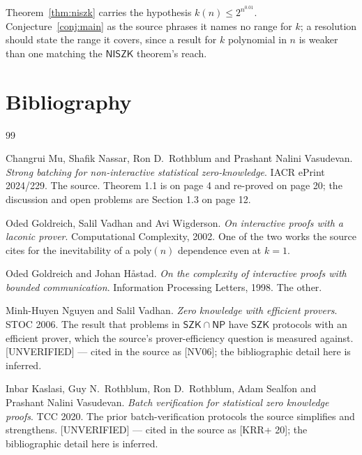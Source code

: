 \documentclass{aicr-conjecture}
\newcommand{\NISZK}{\mathsf{NISZK}}
\newcommand{\SZK}{\mathsf{SZK}}
\begin{document}
\begin{remark}\label{rem:krange}
Theorem~\ref{thm:niszk} carries the hypothesis $k(n) \le 2^{n^{0.01}}$.
Conjecture~\ref{conj:main} as the source phrases it names no range for
$k$; a resolution should state the range it covers, since a result for
$k$ polynomial in $n$ is weaker than one matching the $\NISZK$ theorem's
reach.
\end{remark}

\section{Bibliography}

\begin{aicrbibliography}{99}

Changrui Mu, Shafik Nassar, Ron D.\ Rothblum and Prashant Nalini
Vasudevan.
\emph{Strong batching for non-interactive statistical zero-knowledge}.
IACR ePrint 2024/229.
The source. Theorem 1.1 is on page 4 and re-proved on page 20; the
discussion and open problems are Section 1.3 on page 12.

Oded Goldreich, Salil Vadhan and Avi Wigderson.
\emph{On interactive proofs with a laconic prover}.
Computational Complexity, 2002.
One of the two works the source cites for the inevitability of a
$\mathrm{poly}(n)$ dependence even at $k = 1$.

Oded Goldreich and Johan H\r{a}stad.
\emph{On the complexity of interactive proofs with bounded
communication}.
Information Processing Letters, 1998.
The other.

Minh-Huyen Nguyen and Salil Vadhan.
\emph{Zero knowledge with efficient provers}.
STOC 2006.
The result that problems in $\SZK \cap \mathsf{NP}$ have $\SZK$ protocols
with an efficient prover, which the source's prover-efficiency question
is measured against. [UNVERIFIED] --- cited in the source as [NV06]; the
bibliographic detail here is inferred.

Inbar Kaslasi, Guy N.\ Rothblum, Ron D.\ Rothblum, Adam Sealfon and
Prashant Nalini Vasudevan.
\emph{Batch verification for statistical zero knowledge proofs}.
TCC 2020.
The prior batch-verification protocols the source simplifies and
strengthens. [UNVERIFIED] --- cited in the source as [KRR+ 20]; the
bibliographic detail here is inferred.

\end{aicrbibliography}
\end{document}
